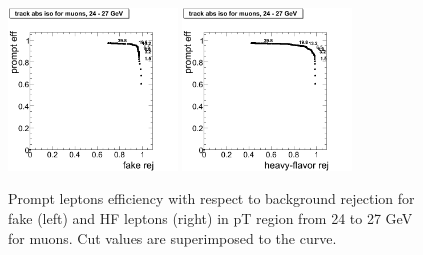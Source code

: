 \begin{figure}[htbp]
\begin{center}
 \includegraphics[width = 0.4\textwidth]{pictures/bkgdRej_sigEff/onlyTrack_muon_fake_ptCut7_ptCut8.png}
\includegraphics[width = 0.4\textwidth]{pictures/bkgdRej_sigEff/onlyTrack_muon_nonPrompt_ptCut7_ptCut8.png}
\caption{\small{Prompt leptons efficiency with respect to background 
rejection for fake (left) and HF leptons (right) in pT region
from 24 to 27 GeV for muons. 
Cut values are superimposed to the curve.}\label{fig:rej_mu8}}
\end{center}
\end{figure}

